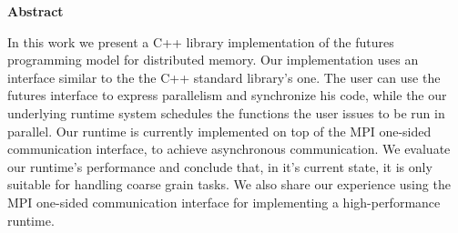 \thispagestyle{empty}
\begin{titlepage}
\begin{center}
{\bf\Large Abstract}\\
\end{center}

In this work we present a C++ library implementation of the futures programming model for distributed memory.
Our implementation uses an interface similar to the the C++ standard library's one.  The user can use the 
futures interface to express parallelism and synchronize his code, while the our underlying runtime system
schedules the functions the user issues to be run in parallel.  Our runtime is currently implemented on top
of the MPI one-sided communication interface, to achieve asynchronous communication.  We evaluate our runtime's
performance and conclude that, in it's current state, it is only suitable for handling coarse grain tasks.
We also share our experience using the MPI one-sided communication interface for implementing a high-performance
runtime. 

\vfill
\end{titlepage}

